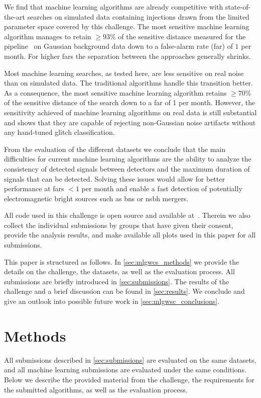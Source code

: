 We find that machine learning algorithms are already competitive with state-of-the-art searches on simulated data containing injections drawn from the limited parameter space covered by this challenge. The most sensitive machine learning algorithm manages to retain $\geq 93\%$ of the sensitive distance measured for the \pycbc pipeline~\cite{Nitz:2021zwj} on Gaussian background data down to a false-alarm rate (\acrshort{far}) of $1$ per month. For higher \acrshort{far}s the separation between the approaches generally shrinks.

Most machine learning searches, as tested here, are less sensitive on real noise than on simulated data. The traditional algorithms handle this transition better. As a consequence, the most sensitive machine learning algorithm retains $\geq 70\%$ of the sensitive distance of the \pycbc search down to a \acrshort{far} of 1 per month. However, the sensitivity achieved of machine learning algorithms on real data is still substantial and shows that they are capable of rejecting non-Gaussian noise artifacts without any hand-tuned glitch classification.

From the evaluation of the different datasets we conclude that the main difficulties for current machine learning algorithms are the ability to analyze the consistency of detected signals between detectors and the maximum duration of signals that can be detected. Solving these issues would allow for better performance at \acrshort{far}s $<1$ per month and enable a fast detection of potentially electromagnetic bright sources such as \acrshort{bns} or \acrshort{nsbh} mergers.

All code used in this challenge is open source and available at~\cite{github}. Therein we also collect the individual submissions by groups that have given their consent, provide the analysis results, and make available all plots used in this paper for all submissions.

This paper is structured as follows. In \autoref{sec:mlgwcs_methods} we provide the details on the challenge, the datasets, as well as the evaluation process. All submissions are briefly introduced in \autoref{sec:submissions}. The results of the challenge and a brief discussion can be found in \autoref{sec:results}. We conclude and give an outlook into possible future work in \autoref{sec:mlgwsc_conclusions}.


\section{Methods}\label{sec:mlgwcs_methods}
All submissions described in \autoref{sec:submissions} are evaluated on the same datasets, and all machine learning submissions are evaluated under the same conditions. Below we describe the provided material from the challenge, the requirements for the submitted algorithms, as well as the evaluation process.

